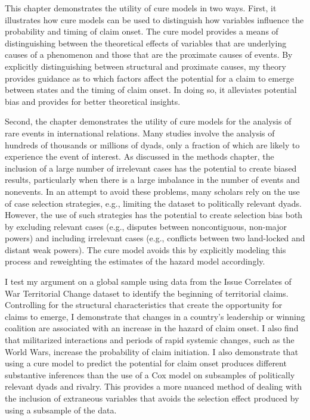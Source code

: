 
This chapter demonstrates the utility of cure models in two ways. First, it illustrates how cure models can be used to distinguish how variables influence the probability and timing of claim onset. The cure model provides a means of distinguishing between the theoretical effects of variables that are underlying causes of a phenomenon and those that are the proximate causes of events. By explicitly distinguishing between structural and proximate causes, my theory provides guidance as to which factors affect the potential for a claim to emerge between states and the timing of claim onset. In doing so, it alleviates potential bias and provides for better theoretical insights.

Second, the chapter demonstrates the utility of cure models for the analysis of rare events in international relations. Many studies involve the analysis of hundreds of thousands or millions of dyads, only a fraction of which are likely to experience the event of interest. As discussed in the methods chapter, the inclusion of a large number of irrelevant cases has the potential to create biased results, particularly when there is a large imbalance in the number of events and nonevents. In an attempt to avoid these problems, many scholars rely on the use of case selection strategies, e.g., limiting the dataset to politically relevant dyads. However, the use of such strategies has the potential to create selection bias both by excluding relevant cases (e.g., disputes between noncontiguous, non-major powers) and including irrelevant cases (e.g., conflicts between two land-locked and distant weak powers). The cure model avoids this by explicitly modeling this process and reweighting the estimates of the hazard model accordingly. 


I test my argument on a global sample using data from the Issue Correlates of War Territorial Change dataset to identify the beginning of territorial claims. Controlling for the structural characteristics that create the opportunity for claims to emerge, I demonstrate that changes in a country’s leadership or winning coalition are associated with an increase in the hazard of claim onset. I also find that militarized interactions and periods of rapid systemic changes, such as the World Wars, increase the probability of claim initiation. I also demonstrate that using a cure model to predict the potential for claim onset produces different substantive inferences than the use of a Cox model on subsamples of politically relevant dyads and rivalry. This provides a more nuanced method of dealing with the inclusion of extraneous variables that avoids the selection effect produced by using a subsample of the data. 



